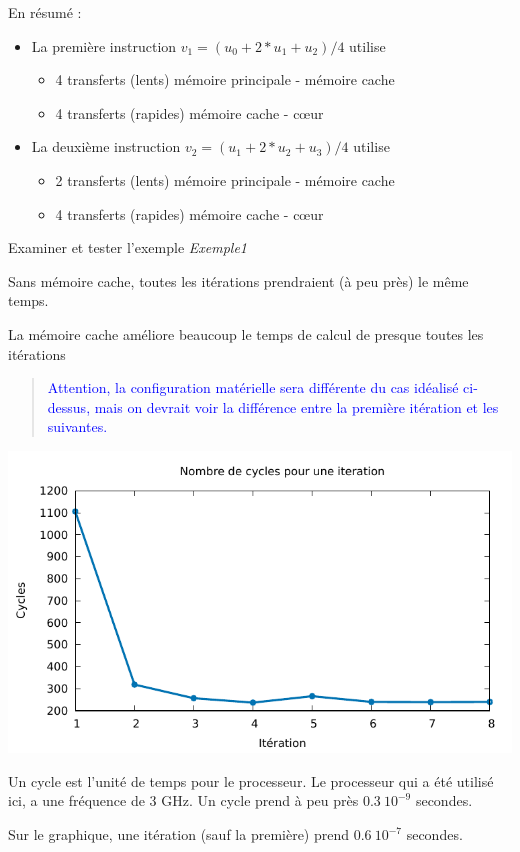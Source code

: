 \documentclass{beamer}
\begin{document}
\begin{frame}
	En résumé :
	\begin{itemize}
		\item La première instruction $v_1 = (u_0 + 2*u_1 + u_2)/4$ utilise
		\begin{itemize}
			\item 4 transferts (lents) mémoire principale - mémoire cache
			\item 4 transferts (rapides)  mémoire cache - c\oe ur
		\end{itemize} 
	\smallskip
		\item La deuxième instruction $v_2 = (u_1 + 2*u_2 + u_3)/4$ utilise
		\begin{itemize}
			\item 2 transferts (lents) mémoire principale - mémoire cache
			\item 4 transferts (rapides) mémoire cache - c\oe ur
		\end{itemize}
	\end{itemize}
\vfill
    Examiner et tester l'exemple {\it Exemple1} 
    
\vfill
    Sans mémoire cache, toutes les itérations prendraient (à peu près) le même temps.
    
    La mémoire cache améliore beaucoup le temps de calcul de presque toutes les itérations 
    
    \begin{quote}
    	\textcolor{blue}{Attention, la configuration matérielle sera différente du cas idéalisé ci-dessus, mais on devrait voir la différence entre la première itération et les suivantes.}
    \end{quote}

\end{frame}

\begin{frame}
	\begin{center}
	\includegraphics[scale=0.8]{Exemples/Exemple1/cycles.pdf}
	\end{center}

Un cycle est l'unité de temps pour le processeur. Le processeur qui a été utilisé ici, a une fréquence de 3 GHz.
Un cycle prend à peu près $0.3\ 10^{-9}$ secondes. 
\vfill

Sur le graphique, une itération (sauf la première) prend $0.6\ 10^{-7}$ secondes.
\end{frame}
\end{document}
